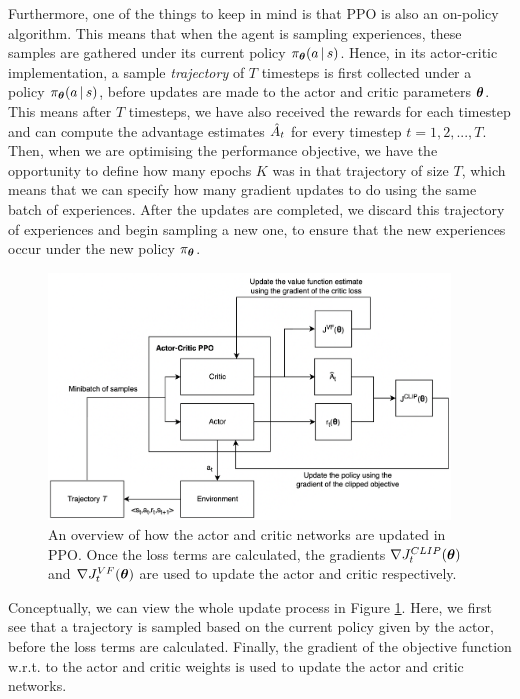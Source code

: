 Furthermore, one of the things to keep in mind is that PPO is also an on-policy algorithm. This means that when the agent is sampling experiences, these samples are gathered under its current policy $\pi_{\boldsymbol{\theta}} (a \, | \, s)$. Hence, in its actor-critic implementation, a sample \textit{trajectory} of $T$ timesteps is first collected under a policy $\pi_{\boldsymbol{\theta}} (a \, | \, s)$, before updates are made to the actor and critic parameters $\boldsymbol{\theta}$. This means after $T$ timesteps, we have also received the rewards for each timestep and can compute the advantage estimates $\hat{A}_t$ for every timestep $t = 1, 2, ..., T$.
Then, when we are optimising the performance objective, we have the opportunity to define how many epochs $K$ was in that trajectory of size $T$, which means that we can specify how many gradient updates to do using the same batch of experiences. After the updates are completed, we discard this trajectory of experiences and begin sampling a new one, to ensure that the new experiences occur under the new policy $\pi_{\boldsymbol{\theta}}$. 
\begin{figure}[ht]
    \centering
    \includegraphics[width=0.95\textwidth]{figures/3_/3_5_ppoOverview.png}
    \caption{An overview of how the actor and critic networks are updated in PPO. Once the loss terms are calculated, the gradients $\nabla J_t^{CLIP}(\boldsymbol{\theta})$ and  $\nabla J_t^{VF}(\boldsymbol{\theta})$ are used to update the actor and critic respectively.}
    \label{fig:3_5_ppoTraining}
\end{figure}
Conceptually, we can view the whole update process in Figure \ref{fig:3_5_ppoTraining}. Here, we first see that a trajectory is sampled based on the current policy given by the actor, before the loss terms are calculated. Finally, the gradient of the objective function w.r.t. to the actor and critic weights is used to update the actor and critic networks.

